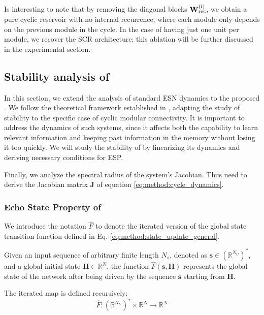 Is interesting to note that by removing the diagonal blocks $\mathbf{W}_{\text{rec}}^{(l)}$, we obtain a pure cyclic reservoir with no internal recurrence, 
where each module only depends on the previous module in the cycle. In the case of having just one unit per module, we recover the SCR architecture; this ablation will be further discussed
in the experimental section.  

\subsection{Stability analysis of \DCR}
\label{sec:method:dcr_analysis}
In this section, we extend the analysis of standard ESN dynamics to the proposed \DCR.
We follow the theoretical framework established in \cite{gallicchio2017echo}, 
 adapting the study of stability to the specific case of cyclic modular connectivity.
It is important to address the dynamics of such systems, since it affects both the capability to learn relevant information and
keeping past information in the memory without losing it too quickly.
We will study the stability of \DCR\@ by linearizing its dynamics and deriving necessary conditions for ESP.

Finally, we analyze the spectral radius of the system's Jacobian.
Thus need to derive the Jacobian matrix $\mathbf{J}$ of equation \ref{eq:method:cycle_dynamics}.
\subsubsection{Echo State Property of \DCR}
\label{sec:method:esp_def}
We introduce the notation $\hat{F}$ to denote the iterated version of the \DCR\@ global state transition function defined in Eq. \ref{eq:method:state_update_general}.

Given an input sequence of arbitrary finite length $N_s$, denoted as $\mathbf{s} \in (\mathbb{R}^{N_U})^*$, and a global initial state $\mathbf{H} \in \mathbb{R}^{N}$, the function 
$\hat{F}(\mathbf{s}, \mathbf{H})$ represents the global state of the network after being driven 
by the sequence $\mathbf{s}$ starting from $\mathbf{H}$.

The iterated map is defined recursively:
\begin{equation}
\label{eq:method:iterated_map}
\hat{F} : (\mathbb{R}^{N_U})^* \times \mathbb{R}^{N} \to \mathbb{R}^{N}
\end{equation}

